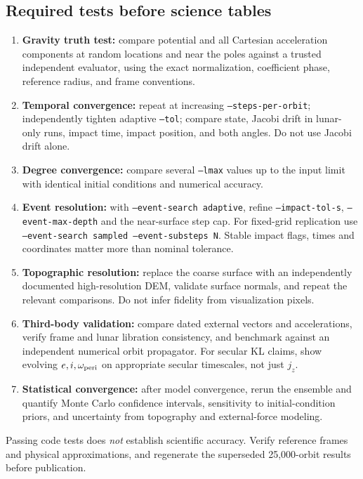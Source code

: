 \documentclass[11pt,a4paper]{article}
\newcommand{\opt}[1]{\texttt{#1}}
\begin{document}
\subsection{Required tests before science tables}
\begin{enumerate}
\item \textbf{Gravity truth test:} compare potential and all Cartesian acceleration components at random locations and near the poles against a trusted independent evaluator, using the exact normalization, coefficient phase, reference radius, and frame conventions.
\item \textbf{Temporal convergence:} repeat at increasing \opt{--steps-per-orbit}; independently tighten adaptive \opt{--tol}; compare state, Jacobi drift in lunar-only runs, impact time, impact position, and both angles. Do not use Jacobi drift alone.
\item \textbf{Degree convergence:} compare several \opt{--lmax} values up to the input limit with identical initial conditions and numerical accuracy.
\item \textbf{Event resolution:} with \opt{--event-search adaptive}, refine \opt{--impact-tol-s}, \opt{--event-max-depth} and the near-surface step cap. For fixed-grid replication use \opt{--event-search sampled --event-substeps N}. Stable impact flags, times and coordinates matter more than nominal tolerance.
\item \textbf{Topographic resolution:} replace the coarse surface with an independently documented high-resolution DEM, validate surface normals, and repeat the relevant comparisons. Do not infer fidelity from visualization pixels.
\item \textbf{Third-body validation:} compare dated external vectors and accelerations, verify frame and lunar libration consistency, and benchmark against an independent numerical orbit propagator. For secular KL claims, show evolving \(e,i,\omega_{\rm peri}\) on appropriate secular timescales, not just \(j_z\).
\item \textbf{Statistical convergence:} after model convergence, rerun the ensemble and quantify Monte Carlo confidence intervals, sensitivity to initial-condition priors, and uncertainty from topography and external-force modeling.
\end{enumerate}
\begin{warningbox}[title={Release status}]
Passing code tests does \emph{not} establish scientific accuracy. Verify reference frames and physical approximations, and regenerate the superseded 25,000-orbit results before publication.
\end{warningbox}
\end{document}
